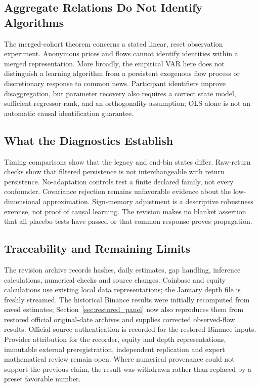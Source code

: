 \documentclass[12pt]{article}
\theoremstyle{definition}
\theoremstyle{remark}
\begin{document}
\subsection{Aggregate Relations Do Not Identify Algorithms}
The merged-cohort theorem concerns a stated linear, reset observation experiment. Anonymous prices and flows cannot identify identities within a merged representation. More broadly, the empirical VAR here does not distinguish a learning algorithm from a persistent exogenous flow process or discretionary response to common news. Participant identifiers improve disaggregation, but parameter recovery also requires a correct state model, sufficient regressor rank, and an orthogonality assumption; OLS alone is not an automatic causal identification guarantee.

\subsection{What the Diagnostics Establish}
Timing comparisons show that the legacy and end-bin states differ. Raw-return checks show that filtered persistence is not interchangeable with return persistence. No-adaptation controls test a finite declared family, not every confounder. Covariance rejection remains unfavorable evidence about the low-dimensional approximation. Sign-memory adjustment is a descriptive robustness exercise, not proof of causal learning. The revision makes no blanket assertion that all placebo tests have passed or that common response proves propagation.

\subsection{Traceability and Remaining Limits}
The revision archive records hashes, daily estimates, gap handling, inference calculations, numerical checks and source changes. Coinbase and equity calculations use existing local data representations; the January depth file is freshly streamed. The historical Binance results were initially recomputed from saved estimates; Section~\ref{sec:restored_panel} now also reproduces them from restored official original-date archives and supplies corrected observed-flow results. Official-source authentication is recorded for the restored Binance inputs. Provider attribution for the recorder, equity and depth representations, immutable external preregistration, independent replication and expert mathematical review remain open. Where numerical provenance could not support the previous claim, the result was withdrawn rather than replaced by a preset favorable number.
\end{document}
